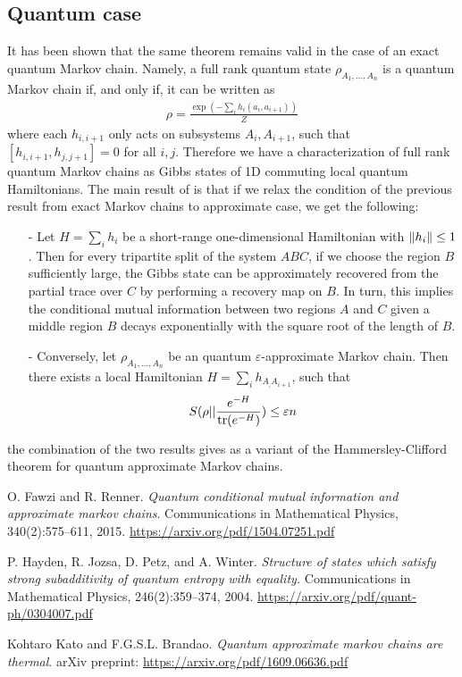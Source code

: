 \documentclass{article}
\begin{document}
\subsection{Quantum case}
It has been shown that the same theorem remains valid in the case of an exact quantum Markov chain. Namely, a full rank quantum state $\rho _{A_1,\dots,A_n}$ is a quantum Markov chain if, and only if, it can be written as
\begin{align}
	\rho=\frac{\exp(-\sum_i h_i(a_i,a_{i+1}))}{Z}
\end{align}
where each $h_{i,i+1}$ only acts on subsystems $A_i, A_{i+1}$, such that $[h_{i,i+1}, h_{j,j+1}] = 0$ for all $i, j$. Therefore we have a characterization of full rank quantum Markov chains as Gibbs states of 1D commuting local quantum Hamiltonians.
The main result of \cite{KB16} is that if we relax the condition of the previous result from exact Markov chains to approximate case, we get the following:
\begin{itemize}
	\item[-] Let $H=\sum_i h_i$ be a short-range one-dimensional Hamiltonian with $\left\|{h_i}\right\| \leq 1$. Then for every tripartite split of the system $ABC$,  if we choose the region $B$ sufficiently large, the Gibbs state can be approximately recovered from the partial trace over $C$ by performing a recovery map on $B$. In turn, this  implies the conditional mutual information between two regions $A$ and $C$ given a middle region $B$ decays exponentially with the square root of the length of $B$. 
	\item[-]  Conversely, let $\rho _{A_1,\dots,A_n}$ be an quantum $\varepsilon$-approximate Markov chain. Then there exists a local Hamiltonian $H=\sum_i h_{A_,A_{i+1}}$, such that
	\begin{align}
		S(\rho ||\frac{e^{-H}}{\tr(e^{-H})})\leq \varepsilon n
	\end{align}
\end{itemize}
the combination of the two results gives as a variant of the Hammersley-Clifford theorem for quantum approximate Markov chains.

  \begin{thebibliography}{99}

 O. Fawzi and R. Renner. \textit{Quantum conditional mutual information and approximate markov chains}. Communications in Mathematical Physics, 340(2):575–611, 2015. \href{https://arxiv.org/pdf/1504.07251.pdf}{https://arxiv.org/pdf/1504.07251.pdf}


 P. Hayden, R. Jozsa, D. Petz, and A. Winter. \textit{Structure of states which satisfy strong subadditivity of quantum entropy with equality.} Communications in Mathematical Physics, 246(2):359–374, 2004. \href{https://arxiv.org/pdf/quant-ph/0304007.pdf}{https://arxiv.org/pdf/quant-ph/0304007.pdf}

 Kohtaro Kato and F.G.S.L. Brandao. \textit{Quantum approximate markov chains are thermal}. arXiv preprint: \href{https://arxiv.org/pdf/1609.06636.pdf}{https://arxiv.org/pdf/1609.06636.pdf}

\end{thebibliography}
\end{document}
